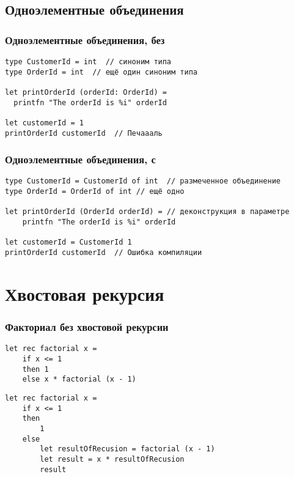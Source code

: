 \documentclass{../../slides-style}
\begin{document}
    \subsection{Одноэлементные объединения}

    \begin{frame}[fragile]
        \frametitle{Одноэлементные объединения, без}
        \begin{verbatim}
type CustomerId = int  // синоним типа
type OrderId = int  // ещё один синоним типа

let printOrderId (orderId: OrderId) =
  printfn "The orderId is %i" orderId

let customerId = 1  
printOrderId customerId  // Печаааль
        \end{verbatim}
    \end{frame}

    \begin{frame}[fragile]
        \frametitle{Одноэлементные объединения, с}
        \begin{verbatim}
type CustomerId = CustomerId of int  // размеченное объединение 
type OrderId = OrderId of int // ещё одно

let printOrderId (OrderId orderId) = // деконструкция в параметре
    printfn "The orderId is %i" orderId

let customerId = CustomerId 1
printOrderId customerId  // Ошибка компиляции
        \end{verbatim}
    \end{frame}

    \section{Хвостовая рекурсия}

    \begin{frame}[fragile]
        \frametitle{Факториал без хвостовой рекурсии}
        \begin{verbatim}
let rec factorial x =
    if x <= 1
    then 1 
    else x * factorial (x - 1)
        \end{verbatim}

        \begin{verbatim}
let rec factorial x =
    if x <= 1
    then
        1
    else
        let resultOfRecusion = factorial (x - 1)
        let result = x * resultOfRecusion
        result
        \end{verbatim}
    \end{frame}
\end{document}

